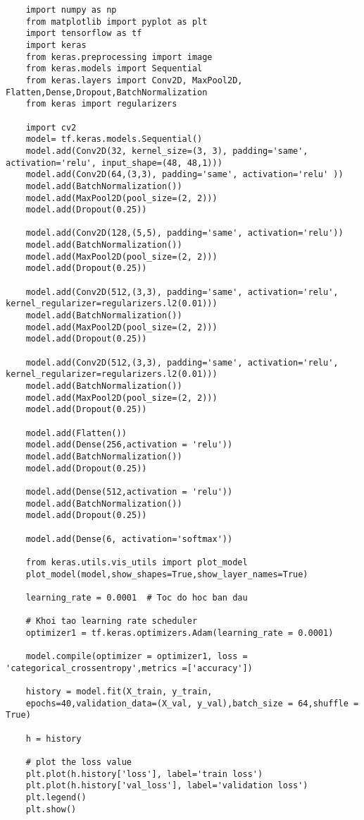 \begin{lstlisting}
	import numpy as np
	from matplotlib import pyplot as plt
	import tensorflow as tf
	import keras
	from keras.preprocessing import image
	from keras.models import Sequential
	from keras.layers import Conv2D, MaxPool2D, Flatten,Dense,Dropout,BatchNormalization
	from keras import regularizers
	
	import cv2
	model= tf.keras.models.Sequential()
	model.add(Conv2D(32, kernel_size=(3, 3), padding='same', activation='relu', input_shape=(48, 48,1)))
	model.add(Conv2D(64,(3,3), padding='same', activation='relu' ))
	model.add(BatchNormalization())
	model.add(MaxPool2D(pool_size=(2, 2)))
	model.add(Dropout(0.25))
	
	model.add(Conv2D(128,(5,5), padding='same', activation='relu'))
	model.add(BatchNormalization())
	model.add(MaxPool2D(pool_size=(2, 2)))
	model.add(Dropout(0.25))
	
	model.add(Conv2D(512,(3,3), padding='same', activation='relu', kernel_regularizer=regularizers.l2(0.01)))
	model.add(BatchNormalization())
	model.add(MaxPool2D(pool_size=(2, 2)))
	model.add(Dropout(0.25))
	
	model.add(Conv2D(512,(3,3), padding='same', activation='relu', kernel_regularizer=regularizers.l2(0.01)))
	model.add(BatchNormalization())
	model.add(MaxPool2D(pool_size=(2, 2)))
	model.add(Dropout(0.25))
	
	model.add(Flatten()) 
	model.add(Dense(256,activation = 'relu'))
	model.add(BatchNormalization())
	model.add(Dropout(0.25))
	
	model.add(Dense(512,activation = 'relu'))
	model.add(BatchNormalization())
	model.add(Dropout(0.25))
	
	model.add(Dense(6, activation='softmax'))
	
	from keras.utils.vis_utils import plot_model 
	plot_model(model,show_shapes=True,show_layer_names=True)
	
	learning_rate = 0.0001  # Toc do hoc ban dau
	
	# Khoi tao learning rate scheduler
	optimizer1 = tf.keras.optimizers.Adam(learning_rate = 0.0001)
	
	model.compile(optimizer = optimizer1, loss = 'categorical_crossentropy',metrics =['accuracy'])
	
	history = model.fit(X_train, y_train,
	epochs=40,validation_data=(X_val, y_val),batch_size = 64,shuffle = True)
	
	h = history
	
	# plot the loss value
	plt.plot(h.history['loss'], label='train loss')
	plt.plot(h.history['val_loss'], label='validation loss')
	plt.legend()
	plt.show()
	

\end{lstlisting}
